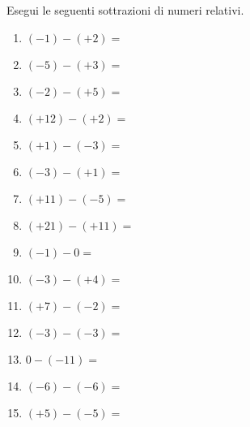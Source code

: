 \begin{esercizio}
Esegui le seguenti sottrazioni di numeri relativi.
\label{ese:2.9}
\begin{multicols}{3}
\begin{enumerate}[noitemsep, label=(\alph*)]
 \item \((-1)-(+2) =~\)
 \item \((-5)-(+3) =~\)
 \item \((-2)-(+5) =~\)
 \item \((+12)-(+2) =\)
 \item \((+1)-(-3) =\)
 \item \((-3)-(+1) =\)
 \item \((+11)-(-5) =\)
 \item \((+21)-(+11) =\)
 \item \((-1)-0 =\)
 \item \((-3)-(+4) =\)
 \item \((+7)-(-2) =\)
 \item \((-3)-(-3) =\)
 \item \(0-(-11) =\)
 \item \((-6)-(-6) =\)
 \item \((+5)-(-5) =\)
\end{enumerate}
\end{multicols}
\end{esercizio}

\newcommand{\rb}[2][-.5]{\raisebox{#1em}{\(#2\)}}

\newcommand{\prb}[2][-.5]{\raisebox{#1em}{\phantom{\(#2\)}}}

\def \prb{\rb} %

\newcommand{\ph}[1]{\phantom{#1}}


\pagebreak %

